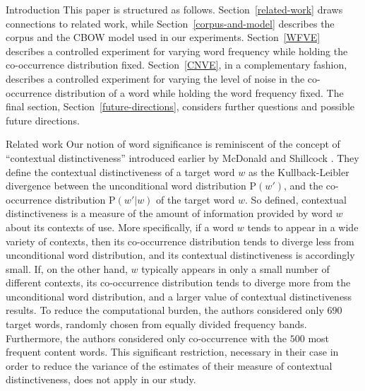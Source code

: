 \documentclass{article} %
\newcommand{\p}{\mathrm{P}}
\newcommand{\mar}[1]{\marginpar{\footnotesize \bfseries
    \raggedright #1}}
\begin{document}
\begin{section}{Introduction}
This paper is structured as follows.  Section~\ref{related-work} draws
connections to related work, while Section~\ref{corpus-and-model} describes
the corpus and the CBOW model used in our experiments.
Section~\ref{WFVE} describes a controlled experiment for varying word
frequency while holding the co-occurrence distribution fixed.
Section~\ref{CNVE}, in a complementary fashion, describes a controlled
experiment for varying the level of noise in the co-occurrence
distribution of a word while holding the word frequency fixed.  The
final section, Section~\ref{future-directions}, considers further questions
and possible future directions.
\end{section}

\begin{section}{Related work}\label{related-work}
\mar{move to other paper?}
Our notion of word significance is reminiscent of the concept of
``contextual distinctiveness'' introduced earlier by McDonald and
Shillcock \cite{mcdonald2001contextual}.  They define the contextual
distinctiveness of a target word $w$ as the Kullback-Leibler divergence
between the unconditional word distribution $\p(w')$, and the
co-occurrence distribution $\p(w' | w)$ of the target word $w$.  So
defined, contextual distinctiveness is a measure of the amount of
information provided by word $w$ about its contexts of use.  More
specifically, if a word $w$ tends to appear in a wide variety of
contexts, then its co-occurrence distribution tends to diverge less from
unconditional word distribution, and its contextual distinctiveness is
accordingly small.  If, on the other hand, $w$ typically appears in only
a small number of different contexts, its co-occurrence distribution
tends to diverge more from the unconditional word distribution, and a
larger value of contextual distinctiveness results.  To reduce the
computational burden, the authors considered only $690$ target words,
randomly chosen from equally divided frequency bands.  Furthermore, the
authors considered only co-occurrence with the $500$ most frequent
content words.  This significant restriction, necessary in their case in
order to reduce the variance of the estimates of their measure of
contextual distinctiveness, does not apply in our study. 


\end{section}
\end{document}
